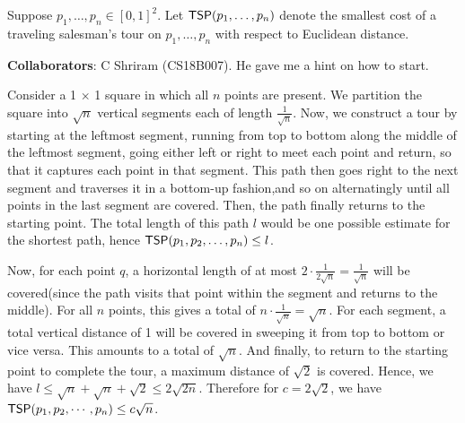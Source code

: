 \documentclass[solution,addpoints,12pt]{exam}
\newcommand{\tsp}{{\sf TSP}}
\begin{document}
\begin{questions}
\question[10]   Suppose $p_1,\ldots, p_n \in [0,1]^2$. Let $\tsp(p_1,\ldots, p_n)$ denote the smallest cost of a traveling salesman's tour on $p_1,\ldots, p_n$ with respect to Euclidean distance.
\begin{solution}
{\bf Collaborators}: C Shriram (CS18B007). He gave me a hint on how to start. 

Consider a 1 $\times$ 1 square in which all $n$ points are present. We partition the square into $\sqrt{n}$ vertical segments each of length $\frac{1}{\sqrt{n}}$. Now, we construct a tour by starting at the leftmost segment, running from top to bottom along the middle of the leftmost segment, going either left or right to meet each point and return, so that it captures each point in that segment. This path then goes right to the next segment and traverses it in a bottom-up fashion,and so on alternatingly until all points in the last segment are covered. Then, the path finally returns to the starting point. The total length of this path $l$ would be one possible estimate for the shortest path, hence $\tsp(p_1,p_2,\ldots,p_n) \leq l$. 

Now, for each point $q$, a horizontal length of at most $2\cdot \frac{1}{2\sqrt{n}} = \frac{1}{\sqrt{n}}$ will be covered(since the path visits that point within the segment and returns to the middle). For all $n$ points, this gives a total of $n\cdot\frac{1}{\sqrt{n}} = \sqrt{n}$. For each segment, a total vertical distance of 1 will be covered in sweeping it from top to bottom or vice versa. This amounts to a total of $\sqrt{n}$. And finally, to return to the starting point to complete the tour, a maximum distance of $\sqrt{2}$ is covered. Hence, we have $l \leq \sqrt{n} + \sqrt{n}+\sqrt{2} \leq 2\sqrt{2n}$. Therefore for $c = 2\sqrt{2}$, we have $\tsp(p_1,p_2,\cdots,p_n) \leq c\sqrt{n}$.  


\end{solution}
\end{questions}
\end{document}
